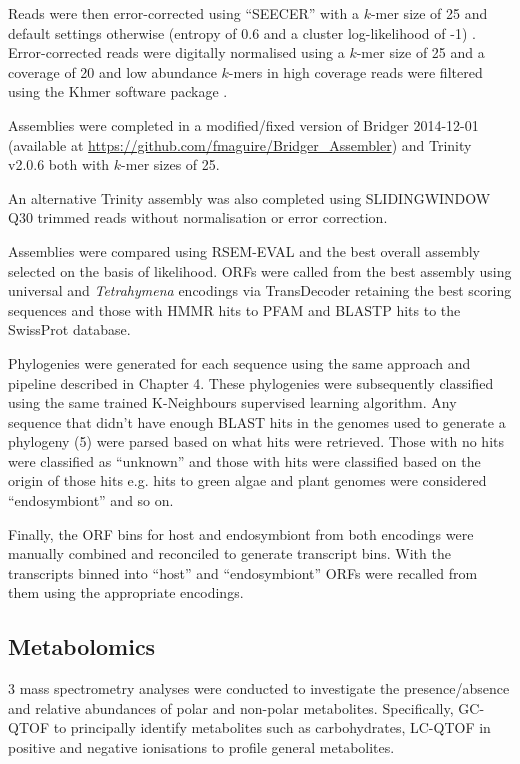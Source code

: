 Reads were then error-corrected using ``SEECER'' with a \(k\)-mer size of 25 and 
default settings otherwise (entropy of 0.6 and a cluster log-likelihood
of -1) \citep{Le2013}.  Error-corrected reads were digitally normalised
using a \(k\)-mer size of 25 and a coverage of 20 \citep{Brown2012} and 
low abundance \(k\)-mers in high coverage reads were filtered \citep{Zhang2014,Zhang2015}
using the Khmer software package \citep{Doring2008,Crusoe2015}.

Assemblies were completed in a modified/fixed version of 
Bridger 2014-12-01 \citep{Chang2015} (available at
\url{https://github.com/fmaguire/Bridger_Assembler}) and 
Trinity v2.0.6 \citep{Grabherr2011,Haas2013} both with \(k\)-mer
sizes of 25.

An alternative Trinity assembly was also completed using
SLIDINGWINDOW Q30 trimmed reads without normalisation or 
error correction.

Assemblies were compared using RSEM-EVAL \citep{Li2014} and the best
overall assembly selected on the basis of likelihood.
ORFs were called from the best assembly using universal and \textit{Tetrahymena} encodings 
via TransDecoder \citep{Haas2013} retaining the best scoring sequences and those
with HMMR hits to PFAM and BLASTP hits to the SwissProt database. 

Phylogenies were generated for each sequence using the same approach and pipeline
described in Chapter 4. These phylogenies were subsequently classified using the 
same trained K-Neighbours supervised learning algorithm.
Any sequence that didn't have enough BLAST hits in the genomes used to generate
a phylogeny (5) were parsed based on what hits were retrieved.
Those with no hits were classified as ``unknown'' and those with
hits were classified based on the origin of those hits e.g. hits
to green algae and plant genomes were considered ``endosymbiont'' and so on.

Finally, the ORF bins for host and endosymbiont 
from both encodings were manually combined and reconciled
to generate transcript bins.  With the transcripts binned into
``host'' and ``endosymbiont'' ORFs were recalled from them using the appropriate
encodings. 

\subsection{Metabolomics}

3 mass spectrometry analyses were conducted to investigate the presence/absence
and relative abundances of polar and non-polar metabolites.
Specifically, GC-QTOF to principally identify metabolites such as carbohydrates,
LC-QTOF in positive and negative ionisations to profile general metabolites.

